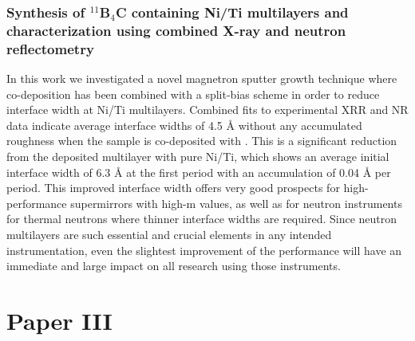 \subsubsection*{Synthesis of $^{\textrm{11}}$B$_\textrm{4}$C containing Ni/Ti multilayers and characterization using combined X-ray and neutron reflectometry}
In this work we investigated a novel magnetron sputter growth technique where \BC co-deposition has been combined with a split-bias scheme in order to reduce interface width at Ni/Ti multilayers. Combined fits to experimental XRR and NR data indicate average interface widths of 4.5 Å without any accumulated roughness when the sample is co-deposited with \BC . This is a significant reduction from the deposited multilayer with pure Ni/Ti, which shows an average initial interface width of 6.3 Å at the first period with an accumulation of 0.04 Å per period. This improved interface width offers very good prospects
for high-performance supermirrors with high-m values, as well as for neutron instruments for thermal neutrons where thinner interface widths are required. Since neutron multilayers are such essential and crucial elements in any intended instrumentation, even the slightest improvement of the performance will have an immediate and large impact on all research using those instruments.

\section{Paper III}
